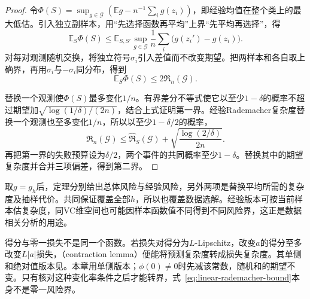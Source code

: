 \begin{proof}
令$\Phi(S)=\sup_{g\in\mathcal G}(\mathbb E g-n^{-1}\sum_i g(z_i))$，即经验均值在整个类上的最大低估。引入独立副样本，用“先选择函数再平均”上界“先平均再选择”，得
\[
 \mathbb E_S\Phi(S)
 \leq\mathbb E_{S,S'}\sup_{g\in\mathcal G}
 \frac1n\sum_i\bigl(g(z_i')-g(z_i)\bigr).
\]
对每对观测随机交换，将独立符号$\sigma_i$引入差值而不改变期望。把两样本和各自取上确界，再用$\sigma_i$与$-\sigma_i$同分布，得到
\begin{equation}
 \mathbb E_S\Phi(S)\leq2\mathfrak R_n(\mathcal G).
 \label{eq:rademacher-symmetrization}
\end{equation}


替换一个观测使$\Phi(S)$最多变化$1/n$。有界差分不等式使它以至少$1-\delta$的概率不超过期望加$\sqrt{\log(1/\delta)/(2n)}$，结合上式证明第一界。经验Rademacher复杂度替换一个观测也至多变化$1/n$，所以以至少$1-\delta/2$的概率，
\[
 \mathfrak R_n(\mathcal G)
 \leq\widehat{\mathfrak R}_S(\mathcal G)
 +\sqrt{\frac{\log(2/\delta)}{2n}}.
\]
再把第一界的失败预算设为$\delta/2$，两个事件的共同概率至少$1-\delta$。替换其中的期望复杂度并合并三项偏差，得到第二界。
\end{proof}

取$g=g_h$后，定理分别给出总体风险与经验风险，另外两项是替换平均所需的复杂度及抽样代价。共同保证覆盖全部$h$，所以也覆盖数据选解。经验版本可按当前样本估复杂度，同VC维空间也可能因样本函数值不同得到不同风险界，这正是数据相关分析的用途。

得分与零一损失不是同一个函数。若损失对得分为$L$-Lipschitz，改变$a$的得分至多改变$L|a|$损失，（contraction lemma）便能将预测复杂度转成损失复杂度。其单侧和绝对值版本见。本章用单侧版本；$\phi(0)\neq0$时先减该常数，随机和的期望不变。只有核对这种变化率条件之后才能转界，式~\eqref{eq:linear-rademacher-bound}本身不是零一风险界。

